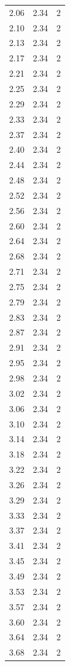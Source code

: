 \begin{longtable}{lrr}
  2.06 & 2.34 & 2 \\
  2.10 & 2.34 & 2 \\
  2.13 & 2.34 & 2 \\
  2.17 & 2.34 & 2 \\
  2.21 & 2.34 & 2 \\
  2.25 & 2.34 & 2 \\
  2.29 & 2.34 & 2 \\
  2.33 & 2.34 & 2 \\
  2.37 & 2.34 & 2 \\
  2.40 & 2.34 & 2 \\
  2.44 & 2.34 & 2 \\
  2.48 & 2.34 & 2 \\
  2.52 & 2.34 & 2 \\
  2.56 & 2.34 & 2 \\
  2.60 & 2.34 & 2 \\
  2.64 & 2.34 & 2 \\
  2.68 & 2.34 & 2 \\
  2.71 & 2.34 & 2 \\
  2.75 & 2.34 & 2 \\
  2.79 & 2.34 & 2 \\
  2.83 & 2.34 & 2 \\
  2.87 & 2.34 & 2 \\
  2.91 & 2.34 & 2 \\
  2.95 & 2.34 & 2 \\
  2.98 & 2.34 & 2 \\
  3.02 & 2.34 & 2 \\
  3.06 & 2.34 & 2 \\
  3.10 & 2.34 & 2 \\
  3.14 & 2.34 & 2 \\
  3.18 & 2.34 & 2 \\
  3.22 & 2.34 & 2 \\
  3.26 & 2.34 & 2 \\
  3.29 & 2.34 & 2 \\
  3.33 & 2.34 & 2 \\
  3.37 & 2.34 & 2 \\
  3.41 & 2.34 & 2 \\
  3.45 & 2.34 & 2 \\
  3.49 & 2.34 & 2 \\
  3.53 & 2.34 & 2 \\
  3.57 & 2.34 & 2 \\
  3.60 & 2.34 & 2 \\
  3.64 & 2.34 & 2 \\
  3.68 & 2.34 & 2 \\

\end{longtable}
